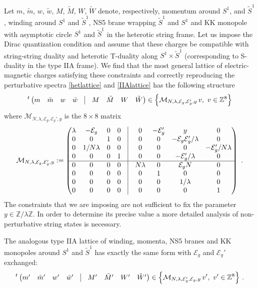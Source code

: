 \documentclass[a4paper,11pt]{article}
\newcommand{\ZZ}{\mathbb{Z}}
\newcommand{\E}{\mathcal{E}}
\newcommand{\M}{\mathcal{M}}
\numberwithin{equation}{section}
\def\be{\begin{equation}}
\def\ee{\end{equation}}
\begin{document}
  Let $m$, $\tilde m$, $w$, $\tilde w$, $M$, $\tilde M$, $W$, $\tilde W$ denote, respectively, momentum around $S^1$, and $\tilde S^1$, winding around $S^1$ and $\tilde S^1$, NS5 brane wrapping $\tilde S^1$ and $S^1$ and KK monopole with asymptotic circle $S^1$ and $\tilde S^1$ in the heterotic string frame. Let us impose the Dirac quantization condition and assume that these charges be compatible with string-string duality and heterotic T-duality along $S^1\times \tilde S^1$ (corresponding to S-duality in the type IIA frame). We find that the most general lattice of electric-magnetic charges satisfying these constraints and correctly reproducing the perturbative spectra \eqref{hetlattice} and \eqref{IIAlattice} has the following structure
\be\label{hetlattice2} {}^t\begin{pmatrix}
 m &
 \tilde m&
 w&
 \tilde w&
 \vline &
 M&
 \tilde M&
 W&
 \tilde W
\end{pmatrix}\in \Bigl\{\M_{N,\lambda,\E_g,\E_g',y}\,
  v,\ v\in\ZZ^8\Bigr\}
\ee 
 where $\M_{N,\lambda,\E_g,\E_g',y}$ is the $8\times 8$ matrix
\be\label{genemlattice} \M_{N,\lambda,\E_g,\E_g',y}:=\begin{pmatrix}
 \lambda & -\E_g & 0 & 0 &\vline & 0 & -\E_g' & y & 0\\
 0 & 0 & 1 & 0  &\vline & 0 & 0 &-\E_g\E_g'/\lambda & 0\\ 
 0 & 1/N\lambda & 0 & 0 &\vline & 0 & 0& 0& -\E_g'/N\lambda\\
 0 & 0 & 0 & 1&\vline & 0 & 0 & -\E_g'/\lambda & 0\\ \hline
 0 & 0 & 0 & 0 &\vline & N\lambda & 0 & \E_g N & 0\\
 0 & 0 & 0 & 0 &\vline & 0 & 1 & 0 & 0\\
 0 & 0 & 0 & 0 &\vline & 0 & 0 & 1/\lambda & 0\\
 0 & 0 & 0 & 0 &\vline & 0 & 0 & 0 & 1
\end{pmatrix}\ .
\ee The constraints that we are imposing are not sufficient to fix the parameter  $y\in\ZZ/\lambda\ZZ$. In order to determine its precise value a more detailed analysis of non-perturbative string states is necessary.

The analogous type IIA lattice of winding, momenta, NS5 branes and KK monopoles around $S^1$ and $\tilde S^1$ has exactly the same form with $\E_g$ and $\E_g'$ exchanged:
\be\label{IIAlattice2} {}^t\begin{pmatrix}
 m' &
 \tilde m'&
 w'&
 \tilde w'&
 \vline &
 M'&
 \tilde M'&
 W'&
 \tilde W'
\end{pmatrix}\in \Bigl\{\M_{N,\lambda,\E_g',\E_g,y}\,
  v',\ v'\in\ZZ^8\Bigr\}\ .
\ee 
\end{document}
